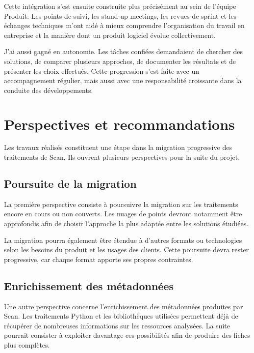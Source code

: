 Cette intégration s'est ensuite construite plus précisément au sein de l'équipe
Produit. Les points de suivi, les stand-up meetings, les revues de sprint et les
échanges techniques m'ont aidé à mieux comprendre l'organisation du travail en
entreprise et la manière dont un produit logiciel évolue collectivement.

J'ai aussi gagné en autonomie. Les tâches confiées demandaient de chercher des
solutions, de comparer plusieurs approches, de documenter les résultats et de
présenter les choix effectués. Cette progression s'est faite avec un
accompagnement régulier, mais aussi avec une responsabilité croissante dans la
conduite des développements.


\section{Perspectives et recommandations}
\label{sec:perspectives_recommandations}

Les travaux réalisés constituent une étape dans la migration progressive des
traitements de Scan. Ils ouvrent plusieurs perspectives pour la suite du
projet.

\subsection{Poursuite de la migration}
\label{subsec:poursuite_migration}

La première perspective consiste à poursuivre la migration sur les traitements
encore en cours ou non couverts. Les nuages de points devront notamment être
approfondis afin de choisir l'approche la plus adaptée entre les solutions
étudiées.

La migration pourra également être étendue à d'autres formats ou technologies
selon les besoins du produit et les usages des clients. Cette poursuite devra
rester progressive, car chaque format apporte ses propres contraintes.

\subsection{Enrichissement des métadonnées}
\label{subsec:enrichissement_metadonnees}

Une autre perspective concerne l'enrichissement des métadonnées produites par
Scan. Les traitements Python et les bibliothèques utilisées permettent déjà de
récupérer de nombreuses informations sur les ressources analysées. La suite
pourrait consister à exploiter davantage ces possibilités afin de produire des
fiches plus complètes.


